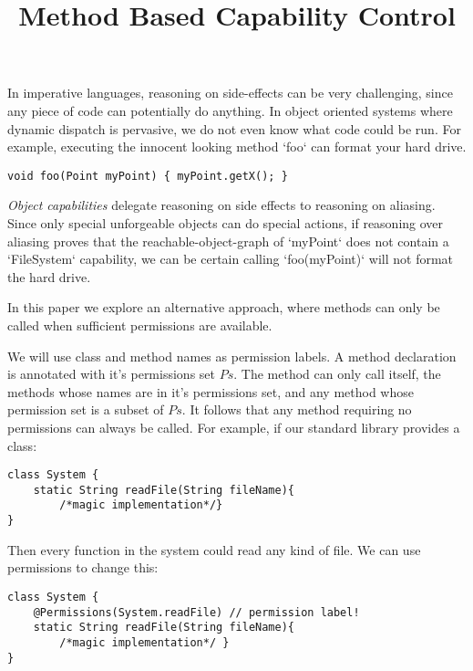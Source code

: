 \documentclass[a4paper,twoside,british,9pt]{extarticle}
\providecommand*{\code}[1]{\Q`#1`}
\begin{document}
\title{Method Based Capability Control}

\maketitle
In imperative languages, reasoning on side-effects can be very challenging,
since any piece of code can potentially do anything. In object oriented
systems where dynamic dispatch is pervasive, we do not even know what code
could be run. For example, executing the innocent looking method \code{foo}
can format your hard drive.

\begin{lstlisting}
void foo(Point myPoint) { myPoint.getX(); }
\end{lstlisting}

\emph{Object capabilities} delegate reasoning on side effects
to reasoning on aliasing. Since only special unforgeable objects can do
special actions, if reasoning over aliasing proves that the
reachable-object-graph of \code{myPoint} does not contain a \code{FileSystem}
capability, we can be certain calling \code{foo(myPoint)}
will not format the hard drive.

In this paper we explore an alternative approach, where methods can only be
called when sufficient permissions are available. 

We will use class and method names as permission labels.
A method declaration is annotated with it's permissions set $Ps$.
The method can only call itself, the methods whose names are in it's permissions set, 
and any method whose permission set is a subset of $Ps$. It follows that any method requiring no permissions can always be called.
For example, if our standard library
provides a class:

\begin{lstlisting}
class System { 
	static String readFile(String fileName){
		/*magic implementation*/}
}
\end{lstlisting}

Then every function in the system could read any kind of file. We
can use permissions to change this:

\begin{lstlisting}
class System { 
	@Permissions(System.readFile) // permission label! 
	static String readFile(String fileName){
		/*magic implementation*/ }
}
\end{lstlisting}
\end{document}
